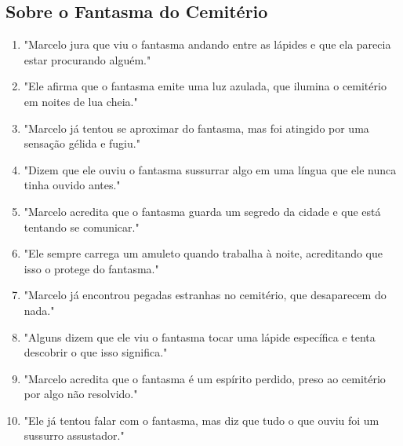 \subsection*{Sobre o Fantasma do Cemitério}
\begin{enumerate}
    \item "Marcelo jura que viu o fantasma andando entre as lápides e que ela parecia estar procurando alguém."
    \item "Ele afirma que o fantasma emite uma luz azulada, que ilumina o cemitério em noites de lua cheia."
    \item "Marcelo já tentou se aproximar do fantasma, mas foi atingido por uma sensação gélida e fugiu."
    \item "Dizem que ele ouviu o fantasma sussurrar algo em uma língua que ele nunca tinha ouvido antes."
    \item "Marcelo acredita que o fantasma guarda um segredo da cidade e que está tentando se comunicar."
    \item "Ele sempre carrega um amuleto quando trabalha à noite, acreditando que isso o protege do fantasma."
    \item "Marcelo já encontrou pegadas estranhas no cemitério, que desaparecem do nada."
    \item "Alguns dizem que ele viu o fantasma tocar uma lápide específica e tenta descobrir o que isso significa."
    \item "Marcelo acredita que o fantasma é um espírito perdido, preso ao cemitério por algo não resolvido."
    \item "Ele já tentou falar com o fantasma, mas diz que tudo o que ouviu foi um sussurro assustador."
\end{enumerate}

